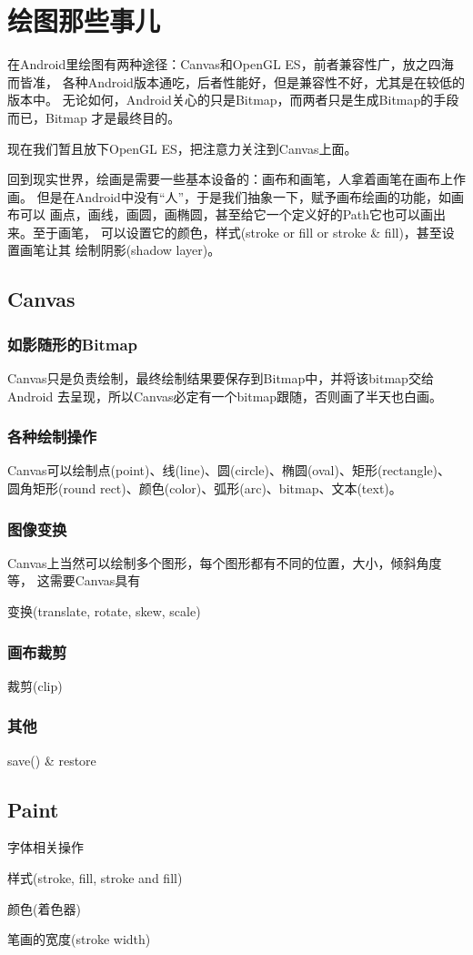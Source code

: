 ﻿\section[绘图那些事儿]{绘图那些事儿}
在Android里绘图有两种途径：Canvas和OpenGL ES，前者兼容性广，放之四海而皆准，
各种Android版本通吃，后者性能好，但是兼容性不好，尤其是在较低的版本中。
无论如何，Android关心的只是Bitmap，而两者只是生成Bitmap的手段而已，Bitmap
才是最终目的。

现在我们暂且放下OpenGL ES，把注意力关注到Canvas上面。

回到现实世界，绘画是需要一些基本设备的：画布和画笔，人拿着画笔在画布上作画。
但是在Android中没有“人”，于是我们抽象一下，赋予画布绘画的功能，如画布可以
画点，画线，画圆，画椭圆，甚至给它一个定义好的Path它也可以画出来。至于画笔，
可以设置它的颜色，样式(stroke or fill or stroke \& fill)，甚至设置画笔让其
绘制阴影(shadow layer)。

\subsection[Canvas]{Canvas}
\subsubsection[如影随形的Bitmap]{如影随形的Bitmap}
Canvas只是负责绘制，最终绘制结果要保存到Bitmap中，并将该bitmap交给Android
去呈现，所以Canvas必定有一个bitmap跟随，否则画了半天也白画。

\subsubsection[各种绘制操作]{各种绘制操作}
Canvas可以绘制点(point)、线(line)、圆(circle)、椭圆(oval)、矩形(rectangle)、
圆角矩形(round rect)、颜色(color)、弧形(arc)、bitmap、文本(text)。

\subsubsection[图像变换]{图像变换}
Canvas上当然可以绘制多个图形，每个图形都有不同的位置，大小，倾斜角度等，
这需要Canvas具有

变换(translate, rotate, skew, scale)

\subsubsection[画布裁剪]{画布裁剪}
裁剪(clip)

\subsubsection[其他]{其他}
save() \& restore

\subsection[Paint]{Paint}

字体相关操作

样式(stroke, fill, stroke and fill)

颜色(着色器)

笔画的宽度(stroke width)

